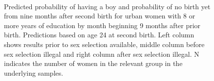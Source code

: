 \documentclass[12pt,letterpaper]{article}
\begin{document}
\begin{figure}[htpb]
{\begin{minipage}{0.31\textwidth}
        \captionsetup[subfigure]{labelformat=empty,position=top,captionskip=-1pt,farskip=-0.5pt}
        \\
        \captionsetup[subfigure]{labelformat=parens}
    \end{minipage}
}
\setcounter{subfigure}{3}
\caption{Predicted probability of having a boy and probability of
no birth yet from nine months after second birth for urban 
women with 8 or more years of education by month beginning 9 months after prior birth. 
Predictions based on age 24 at second birth.
Left column shows results prior to sex selection available, middle column before
sex selection illegal and right column after sex selection illegal.
N indicates the number of women in the relevant group in the underlying samples.
}
\label{fig:results_spell3_high_urban}
\end{figure}
\end{document}
